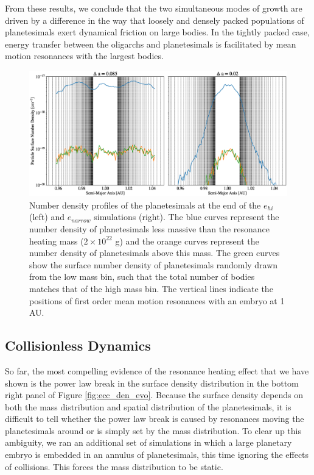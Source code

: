 From these results, we conclude that the two simultaneous modes of growth are driven by a difference in the way that loosely 
and densely packed populations of planetesimals exert dynamical friction on large bodies. In the tightly packed case, energy 
transfer between the oligarchs and planetesimals is facilitated by mean motion resonances with the largest bodies.

\begin{figure}
    \includegraphics[width=1.0\textwidth]{figures/plSS/surf_den_dyn_fric.eps}
    \caption{Number density profiles of the planetesimals at the end of the $e_{hi}$ (left) and $e_{narrow}$ simulations (right). 
    The blue curves represent the number density of planetesimals less massive than the resonance heating mass ($2 \times 
    10^{22}$ g) and the orange curves represent the number density of planetesimals above this mass. The green curves show 
    the surface number density of planetesimals randomly drawn from the low mass bin, such that the total number of bodies 
    matches that of the high mass bin. The vertical lines indicate the positions of first order mean motion resonances with an 
    embryo at 1 AU.}
    \label{fig:num_den}
\end{figure}

\subsection{Collisionless Dynamics}\label{sec:dynint}

So far, the most compelling evidence of the resonance heating effect that we have shown is the power law break in the surface 
density distribution in the bottom right panel of Figure \ref{fig:ecc_den_evo}. Because the surface density depends on both the 
mass distribution and spatial distribution of the planetesimals, it is difficult to tell whether the power law break is caused by 
resonances moving the planetesimals around or is simply set by the mass distribution. To clear up this ambiguity, we ran an 
additional set of simulations in which a large planetary embryo is embedded in an annulus of planetesimals, this time ignoring 
the effects of collisions. This forces the mass distribution to be static.

